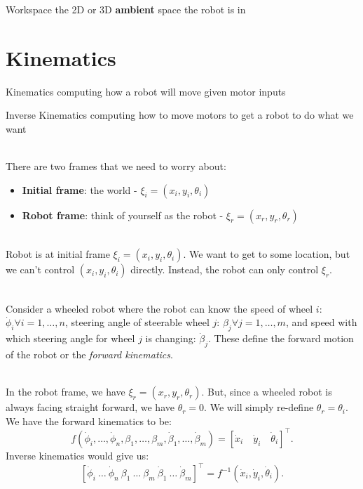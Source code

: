 \documentclass[13pt]{article}
\begin{document}
\begin{defn}{Workspace}
	the 2D or 3D \textbf{ambient} space the robot is in
\end{defn}

\section{Kinematics}%
\begin{defn}{Kinematics}
	computing how a robot will move given motor inputs
\end{defn}

\begin{defn}{Inverse Kinematics}
	computing how to move motors to get a robot to do what we want
\end{defn}

\hfill \\
\noindent
There are two frames that we need to worry about:
\begin{itemize}
	\item \textbf{Initial frame}: the world - $\xi_{i} = (x_{i}, y_{i}, \theta_{i})$
	\item \textbf{Robot frame}: think of yourself as the robot - $\xi_{r} = (x_{r}, y_{r}, \theta_{r})$
\end{itemize}

\hfill \\
\noindent
Robot is at initial frame $\xi_{i} = (x_{i}, y_{i}, \theta_{i})$. We want to get to some location, but we can't control $(x_i,
y_{i}, \theta_{i})$ directly. Instead, the robot can only control $\xi_{r}$.

\hfill \\ \noindent Consider a wheeled robot where the robot can know the speed of wheel $i$: $\dot \phi_{i} \forall i =
1, \ldots, n$, steering angle of steerable wheel $j$: $\beta_{j} \forall j = 1, \ldots, m$, and speed with which
steering angle for wheel $j$ is changing: $\dot \beta_{j}$. These define the forward motion of the robot or the
\textit{forward kinematics}.

\hfill \\
\noindent
In the robot frame, we have $\xi_{r} = (x_{r}, y_{r}, \theta_{r})$. But, since a wheeled robot is always facing straight
forward, we have $\theta_{r} = 0$. We will simply re-define $\theta_{r} = \theta_{i}$. We have the forward kinematics
to be: \[
	f(\dot \phi_{i}, \ldots, \dot \phi_{n}, \beta_{1}, \ldots, \beta_{m}, \dot \beta_{1}, \ldots, \dot \beta_{m}) =
	[\dot x_{i} \quad \dot y_{i} \quad \dot \theta_{i} ]^{\top}
.\]
Inverse kinematics would give us: \[
	[\dot \phi_{i} \ \ldots \ \dot \phi_{n} \ \beta_{1} \ \ldots \ \beta_{m} \ \dot \beta_{1} \ \ldots \ \dot \beta_{m}]^{\top} =
	f^{-1}(\dot x_{i}, \dot y_{i}, \dot \theta_{i})
.\]
\end{document}
